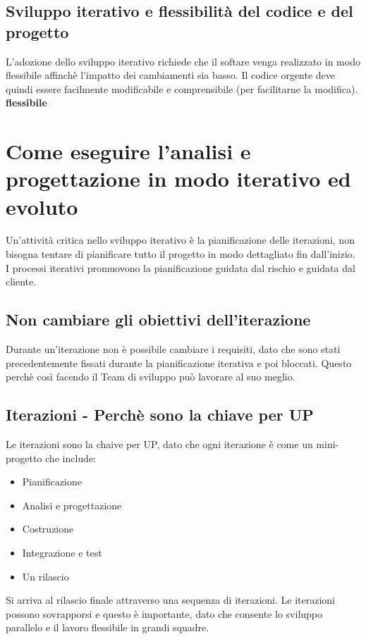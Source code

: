 \subsection{Sviluppo iterativo e flessibilità del codice e del progetto}
L'adozione dello sviluppo iterativo richiede che il softare venga realizzato in modo flessibile
affinchè l'impatto dei cambiamenti sia basso. Il codice orgente deve quindi essere facilmente
modificabile e comprensibile (per facilitarne la modifica).
\textbf{flessibile}
\section{Come eseguire l'analisi e progettazione in modo iterativo
ed evoluto}
Un'attività critica nello sviluppo iterativo è la pianificazione delle iterazioni,
non bisogna tentare di pianificare tutto il progetto in modo dettagliato fin dall'inizio.
I processi iterativi promuovono la pianificazione guidata dal rischio e guidata dal cliente.
\subsection{Non cambiare gli obiettivi dell'iterazione}
Durante un'iterazione non è possibile cambiare i requisiti, dato che sono stati
precedentemente fissati durante la pianificazione iterativa e poi bloccati.
Questo perchè così facendo il Team di sviluppo può lavorare al suo meglio.
\subsection{Iterazioni - Perchè sono la chiave per UP}
Le iterazioni sono la chaive per UP, dato che ogni iterazione è come un mini-progetto 
che include:
\begin{itemize}
    \item Pianificazione
    \item Analisi e progettazione
    \item Costruzione
    \item Integrazione e test
    \item Un rilascio
\end{itemize}
Si arriva al rilascio finale attraverso una sequenza di iterazioni.
Le iterazioni possono sovrapporsi e questo è importante, dato che consente lo
sviluppo parallelo e il lavoro flessibile in grandi squadre.
